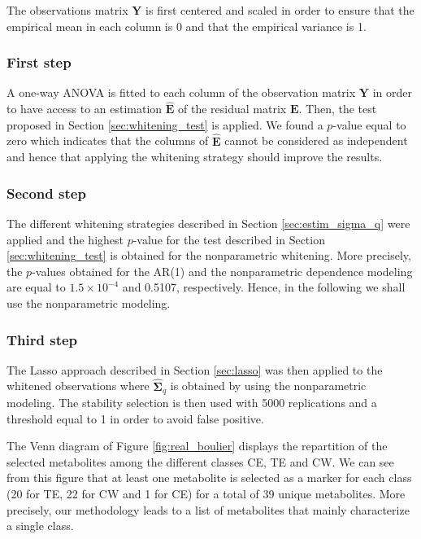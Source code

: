 The observations matrix $\boldsymbol{Y}$ is first centered and scaled in order to ensure that the
empirical mean in each column is 0 and that the empirical variance is 1.

\subsubsection{First step} A one-way ANOVA is fitted to each column of the observation matrix 
 $\boldsymbol{Y}$ in order to have access to an
  estimation $\widehat{\boldsymbol{E}}$ of the residual matrix
  $\boldsymbol{E}$. Then, the test proposed in Section \ref{sec:whitening_test} is applied. 
We found a $p$-value equal to zero
which indicates that the columns of $\widehat{\boldsymbol{E}}$ cannot
be considered as independent and hence that applying the whitening
strategy should improve the results.

\subsubsection{Second step} The different whitening strategies described in Section \ref{sec:estim_sigma_q} were applied and the highest 
$p$-value for the test described in Section \ref{sec:whitening_test} is obtained for the nonparametric whitening. 
More precisely, the $p$-values obtained for the AR(1) and the nonparametric dependence modeling
are equal to $1.5\times 10^{-4}$ and 0.5107, respectively. Hence, in the following we shall use the nonparametric modeling.


\subsubsection{Third step} The Lasso approach described in Section \ref{sec:lasso} was then applied to the
  whitened observations where  $\widehat{\boldsymbol{\Sigma}}_q$ is obtained by using the
  nonparametric modeling. The stability selection is then used with 5000 replications and a threshold equal to 1 in order to avoid false positive.

The Venn diagram of Figure \ref{fig:real_boulier} displays the repartition of the selected metabolites among the different classes CE, TE and CW.
We can see from this figure that at least one metabolite
is selected as a marker for each class (20 for TE, 22 for CW and 1 for
CE) for a total of 39 unique metabolites. More precisely, our methodology leads to a list of metabolites that mainly characterize a single class.



